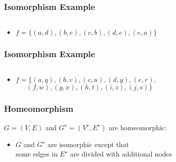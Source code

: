\documentclass[dvipsnames]{beamer}
\begin{document}
\begin{frame}
  \frametitle{Isomorphism Example}

  \begin{example}
    \begin{columns}
      \begin{center}
      \end{center}

      \begin{center}
      \end{center}
    \end{columns}

    \pause
    \bigskip
    \begin{itemize}
      \item $f = \{(a,d),(b,e),(c,b),(d,c),(e,a)\}$
    \end{itemize}
  \end{example}
\end{frame}

\begin{frame}
  \frametitle{Isomorphism Example}

  \begin{example}
    \begin{columns}
      \begin{center}
      \end{center}

      \begin{center}
      \end{center}
    \end{columns}

    \bigskip
    \begin{itemize}
      \item $f = \{(a,q),(b,v),(c,u),(d,y),(e,r),$\\
        $~~~~~~~(f,w),(g,x),(h,t),(i,z),(j,s)\}$
    \end{itemize}
  \end{example}
\end{frame}

\begin{frame}
  \frametitle{Homeomorphism}

  \begin{definition}
    $G=(V,E)$ and $G^\star=(V^\star,E^\star)$ are \alert{homeomorphic}:
    \begin{itemize}
      \item $G$ and $G^\star$ are isomorphic except that\\
        some edges in $E^\star$ are divided with additional nodes
    \end{itemize}
  \end{definition}
\end{frame}
\end{document}
